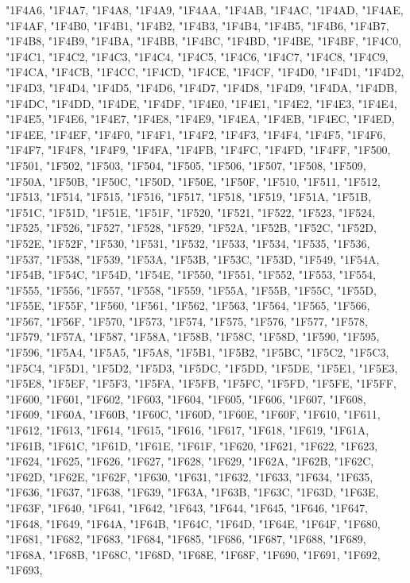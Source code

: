 {"1F4A6,
"1F4A7,
"1F4A8,
"1F4A9,
"1F4AA,
"1F4AB,
"1F4AC,
"1F4AD,
"1F4AE,
"1F4AF,
"1F4B0,
"1F4B1,
"1F4B2,
"1F4B3,
"1F4B4,
"1F4B5,
"1F4B6,
"1F4B7,
"1F4B8,
"1F4B9,
"1F4BA,
"1F4BB,
"1F4BC,
"1F4BD,
"1F4BE,
"1F4BF,
"1F4C0,
"1F4C1,
"1F4C2,
"1F4C3,
"1F4C4,
"1F4C5,
"1F4C6,
"1F4C7,
"1F4C8,
"1F4C9,
"1F4CA,
"1F4CB,
"1F4CC,
"1F4CD,
"1F4CE,
"1F4CF,
"1F4D0,
"1F4D1,
"1F4D2,
"1F4D3,
"1F4D4,
"1F4D5,
"1F4D6,
"1F4D7,
"1F4D8,
"1F4D9,
"1F4DA,
"1F4DB,
"1F4DC,
"1F4DD,
"1F4DE,
"1F4DF,
"1F4E0,
"1F4E1,
"1F4E2,
"1F4E3,
"1F4E4,
"1F4E5,
"1F4E6,
"1F4E7,
"1F4E8,
"1F4E9,
"1F4EA,
"1F4EB,
"1F4EC,
"1F4ED,
"1F4EE,
"1F4EF,
"1F4F0,
"1F4F1,
"1F4F2,
"1F4F3,
"1F4F4,
"1F4F5,
"1F4F6,
"1F4F7,
"1F4F8,
"1F4F9,
"1F4FA,
"1F4FB,
"1F4FC,
"1F4FD,
"1F4FF,
"1F500,
"1F501,
"1F502,
"1F503,
"1F504,
"1F505,
"1F506,
"1F507,
"1F508,
"1F509,
"1F50A,
"1F50B,
"1F50C,
"1F50D,
"1F50E,
"1F50F,
"1F510,
"1F511,
"1F512,
"1F513,
"1F514,
"1F515,
"1F516,
"1F517,
"1F518,
"1F519,
"1F51A,
"1F51B,
"1F51C,
"1F51D,
"1F51E,
"1F51F,
"1F520,
"1F521,
"1F522,
"1F523,
"1F524,
"1F525,
"1F526,
"1F527,
"1F528,
"1F529,
"1F52A,
"1F52B,
"1F52C,
"1F52D,
"1F52E,
"1F52F,
"1F530,
"1F531,
"1F532,
"1F533,
"1F534,
"1F535,
"1F536,
"1F537,
"1F538,
"1F539,
"1F53A,
"1F53B,
"1F53C,
"1F53D,
"1F549,
"1F54A,
"1F54B,
"1F54C,
"1F54D,
"1F54E,
"1F550,
"1F551,
"1F552,
"1F553,
"1F554,
"1F555,
"1F556,
"1F557,
"1F558,
"1F559,
"1F55A,
"1F55B,
"1F55C,
"1F55D,
"1F55E,
"1F55F,
"1F560,
"1F561,
"1F562,
"1F563,
"1F564,
"1F565,
"1F566,
"1F567,
"1F56F,
"1F570,
"1F573,
"1F574,
"1F575,
"1F576,
"1F577,
"1F578,
"1F579,
"1F57A,
"1F587,
"1F58A,
"1F58B,
"1F58C,
"1F58D,
"1F590,
"1F595,
"1F596,
"1F5A4,
"1F5A5,
"1F5A8,
"1F5B1,
"1F5B2,
"1F5BC,
"1F5C2,
"1F5C3,
"1F5C4,
"1F5D1,
"1F5D2,
"1F5D3,
"1F5DC,
"1F5DD,
"1F5DE,
"1F5E1,
"1F5E3,
"1F5E8,
"1F5EF,
"1F5F3,
"1F5FA,
"1F5FB,
"1F5FC,
"1F5FD,
"1F5FE,
"1F5FF,
"1F600,
"1F601,
"1F602,
"1F603,
"1F604,
"1F605,
"1F606,
"1F607,
"1F608,
"1F609,
"1F60A,
"1F60B,
"1F60C,
"1F60D,
"1F60E,
"1F60F,
"1F610,
"1F611,
"1F612,
"1F613,
"1F614,
"1F615,
"1F616,
"1F617,
"1F618,
"1F619,
"1F61A,
"1F61B,
"1F61C,
"1F61D,
"1F61E,
"1F61F,
"1F620,
"1F621,
"1F622,
"1F623,
"1F624,
"1F625,
"1F626,
"1F627,
"1F628,
"1F629,
"1F62A,
"1F62B,
"1F62C,
"1F62D,
"1F62E,
"1F62F,
"1F630,
"1F631,
"1F632,
"1F633,
"1F634,
"1F635,
"1F636,
"1F637,
"1F638,
"1F639,
"1F63A,
"1F63B,
"1F63C,
"1F63D,
"1F63E,
"1F63F,
"1F640,
"1F641,
"1F642,
"1F643,
"1F644,
"1F645,
"1F646,
"1F647,
"1F648,
"1F649,
"1F64A,
"1F64B,
"1F64C,
"1F64D,
"1F64E,
"1F64F,
"1F680,
"1F681,
"1F682,
"1F683,
"1F684,
"1F685,
"1F686,
"1F687,
"1F688,
"1F689,
"1F68A,
"1F68B,
"1F68C,
"1F68D,
"1F68E,
"1F68F,
"1F690,
"1F691,
"1F692,
"1F693,
}
